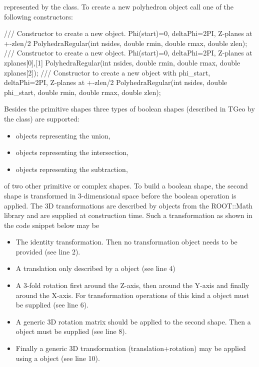 \documentclass[10pt,a4paper]{article}
\begin{document}
\begin{itemize}
    represented by the  class. To create a new polyhedron
    object call one of the following constructors:
\begin{code}
/// Constructor to create a new object. Phi(start)=0, deltaPhi=2PI, Z-planes at +-zlen/2
PolyhedraRegular(int nsides, double rmin, double rmax, double zlen);
/// Constructor to create a new object. Phi(start)=0, deltaPhi=2PI, Z-planes at zplanes[0],[1]
PolyhedraRegular(int nsides, double rmin, double rmax, double zplanes[2]);
/// Constructor to create a new object with phi_start, deltaPhi=2PI, Z-planes at +-zlen/2
PolyhedraRegular(int nsides, double phi_start, double rmin, double rmax, double zlen);
\end{code}
\end{itemize}

\noindent
Besides the primitive shapes three types of boolean shapes (described in TGeo by the
 class)
are supported:

\begin{itemize}\itemcompact
\item {} objects representing the union,
\item {} objects representing the intersection,
\item {} objects representing the subtraction,
\end{itemize}

\noindent
of two other primitive or complex shapes. To build a boolean shape, the 
second shape is transformed in 3-dimensional space before the boolean 
operation is applied. The 3D transformations are described by objects from the 
ROOT::Math library and are supplied at construction time. 
Such a transformation as shown in the code snippet below may be 

\begin{itemize}\itemcompact
\item The identity transformation. Then no transformation object needs to be provided (see line 2).

\item A translation only described by a  object (see line 4)

\item A 3-fold rotation first around the Z-axis, then around the Y-axis and finally around the X-axis.
       For transformation operations of this kind a  object must be supplied (see line 6).

\item A generic 3D rotation matrix should be applied to the second shape. Then a 
       object must be supplied (see line 8).

\item Finally a generic 3D transformation (translation+rotation) may be applied using a 
        object (see line 10).
\end{itemize}
\end{document}
